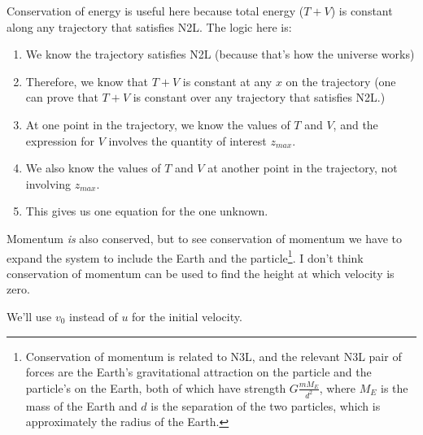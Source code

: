 Conservation of energy is useful here because total energy ($T + V$) is constant along any
trajectory that satisfies N2L. The logic here is:
\begin{enumerate}
\item We know the trajectory satisfies N2L (because that's how the universe works)
\item Therefore, we know that $T + V$ is constant at any $x$ on the trajectory (one can prove that
  $T+V$ is constant over any trajectory that satisfies N2L.)
\item At one point in the trajectory, we know the values of $T$ and $V$, and the expression for $V$
  involves the quantity of interest $z_{max}$.
\item We also know the values of $T$ and $V$ at another point in the trajectory, not involving
  $z_{max}$.
\item This gives us one equation for the one unknown.
\end{enumerate}

Momentum \textit{is} also conserved, but to see conservation of momentum we have to expand the
system to include the Earth and the particle\footnote{Conservation of momentum is related to N3L,
  and the relevant N3L pair of forces are the Earth's gravitational attraction on the particle and
  the particle's on the Earth, both of which have strength $G\frac{mM_E}{d^2}$, where $M_E$ is the
  mass of the Earth and $d$ is the separation of the two particles, which is approximately the
  radius of the Earth.}. I don't think conservation of momentum can be used to find the height at
which velocity is zero.


We'll use $v_0$ instead of $u$ for the initial velocity.

